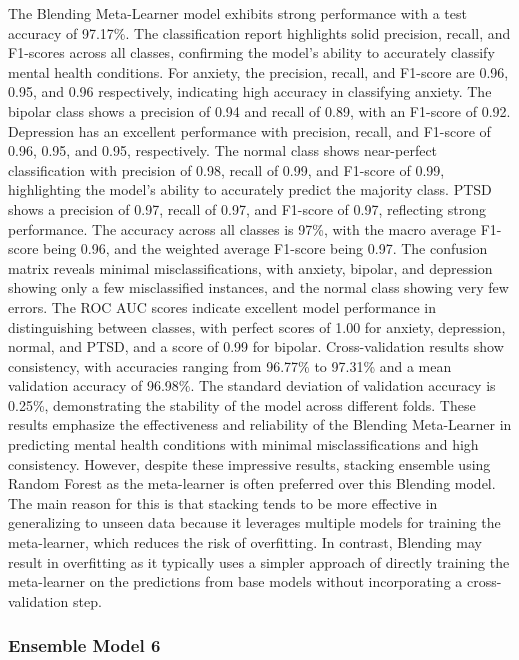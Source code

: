 \noindent
The Blending Meta-Learner model exhibits strong performance with a test accuracy of 97.17\%. The classification report highlights solid precision, recall, and F1-scores across all classes, confirming the model's ability to accurately classify mental health conditions. For anxiety, the precision, recall, and F1-score are 0.96, 0.95, and 0.96 respectively, indicating high accuracy in classifying anxiety. The bipolar class shows a precision of 0.94 and recall of 0.89, with an F1-score of 0.92. Depression has an excellent performance with precision, recall, and F1-score of 0.96, 0.95, and 0.95, respectively. The normal class shows near-perfect classification with precision of 0.98, recall of 0.99, and F1-score of 0.99, highlighting the model's ability to accurately predict the majority class. PTSD shows a precision of 0.97, recall of 0.97, and F1-score of 0.97, reflecting strong performance. The accuracy across all classes is 97\%, with the macro average F1-score being 0.96, and the weighted average F1-score being 0.97. The confusion matrix reveals minimal misclassifications, with anxiety, bipolar, and depression showing only a few misclassified instances, and the normal class showing very few errors. The ROC AUC scores indicate excellent model performance in distinguishing between classes, with perfect scores of 1.00 for anxiety, depression, normal, and PTSD, and a score of 0.99 for bipolar. Cross-validation results show consistency, with accuracies ranging from 96.77\% to 97.31\% and a mean validation accuracy of 96.98\%. The standard deviation of validation accuracy is 0.25\%, demonstrating the stability of the model across different folds. These results emphasize the effectiveness and reliability of the Blending Meta-Learner in predicting mental health conditions with minimal misclassifications and high consistency. However, despite these impressive results, stacking ensemble using Random Forest as the meta-learner is often preferred over this Blending model. The main reason for this is that stacking tends to be more effective in generalizing to unseen data because it leverages multiple models for training the meta-learner, which reduces the risk of overfitting. In contrast, Blending may result in overfitting as it typically uses a simpler approach of directly training the meta-learner on the predictions from base models without incorporating a cross-validation step.



\subsubsection{Ensemble Model 6}

